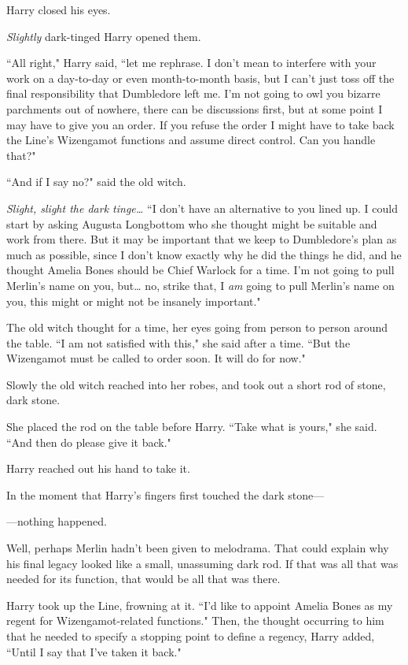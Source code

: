 Harry closed his eyes.

\emph{Slightly} dark-tinged Harry opened them.

``All right," Harry said, ``let me rephrase. I don't mean to interfere with your work on a day-to-day or even month-to-month basis, but I can't just toss off the final responsibility that Dumbledore left me. I'm not going to owl you bizarre parchments out of nowhere, there can be discussions first, but at some point I may have to give you an order. If you refuse the order I might have to take back the Line's Wizengamot functions and assume direct control. Can you handle that?"

``And if I say no?" said the old witch.

\emph{Slight, slight the dark tinge{\ldots}} ``I don't have an alternative to you lined up. I could start by asking Augusta Longbottom who she thought might be suitable and work from there. But it may be important that we keep to Dumbledore's plan as much as possible, since I don't know exactly why he did the things he did, and he thought Amelia Bones should be Chief Warlock for a time. I'm not going to pull Merlin's name on you, but{\ldots} no, strike that, I \emph{am} going to pull Merlin's name on you, this might or might not be insanely important."

The old witch thought for a time, her eyes going from person to person around the table. ``I am not satisfied with this," she said after a time. ``But the Wizengamot must be called to order soon. It will do for now."

Slowly the old witch reached into her robes, and took out a short rod of stone, dark stone.

She placed the rod on the table before Harry. ``Take what is yours," she said. ``And then do please give it back."

Harry reached out his hand to take it.

In the moment that Harry's fingers first touched the dark stone---

---nothing happened.

Well, perhaps Merlin hadn't been given to melodrama. That could explain why his final legacy looked like a small, unassuming dark rod. If that was all that was needed for its function, that would be all that was there.

Harry took up the Line, frowning at it. ``I'd like to appoint Amelia Bones as my regent for Wizengamot-related functions." Then, the thought occurring to him that he needed to specify a stopping point to define a regency, Harry added, ``Until I say that I've taken it back."

